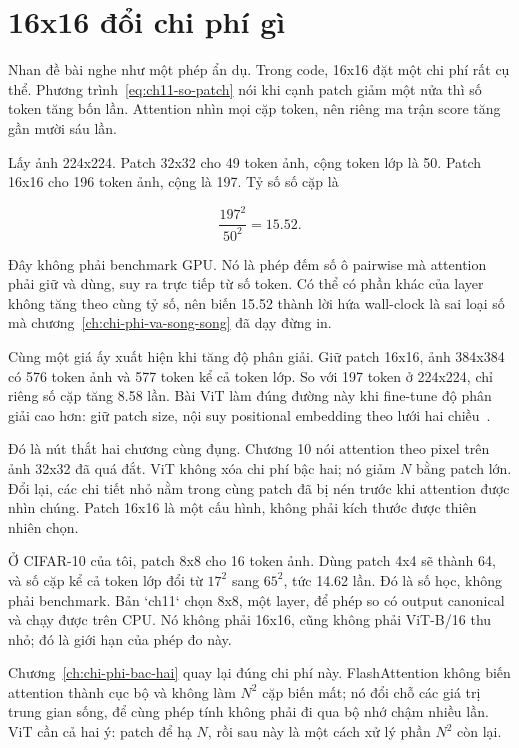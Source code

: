 \section{16x16 đổi chi phí gì}
\label{sec:ch11-chi-phi-patch}

%
Nhan đề bài nghe như một phép ẩn dụ. Trong code, 16x16 đặt một chi phí rất cụ
thể. Phương trình~\ref{eq:ch11-so-patch} nói khi cạnh patch giảm một nửa thì
số token tăng bốn lần. Attention nhìn mọi cặp token, nên riêng ma trận score
tăng gần mười sáu lần.

Lấy ảnh 224x224. Patch 32x32 cho 49 token ảnh, cộng token lớp là 50. Patch
16x16 cho 196 token ảnh, cộng  là 197. Tỷ số số cặp là

\begin{equation}
\label{eq:ch11-chi-phi-patch}
\frac{197^2}{50^2} = 15.52.
\end{equation}

Đây không phải benchmark GPU. Nó là phép đếm số ô pairwise mà attention phải
giữ và dùng, suy ra trực tiếp từ số token. Có thể có phần khác của layer không
tăng theo cùng tỷ số, nên biến 15.52 thành lời hứa wall-clock là sai loại số
mà chương~\ref{ch:chi-phi-va-song-song} đã dạy đừng in.

Cùng một giá ấy xuất hiện khi tăng độ phân giải. Giữ patch 16x16, ảnh 384x384
có 576 token ảnh và 577 token kể cả token lớp. So với 197 token ở 224x224,
chỉ riêng số cặp tăng 8.58 lần. Bài ViT làm đúng đường này khi fine-tune độ
phân giải cao hơn: giữ patch size, nội suy positional embedding theo lưới
hai chiều~\autocite{dosovitskiy2021vit}.

Đó là nút thắt hai chương cùng đụng. Chương 10 nói attention theo pixel trên
ảnh 32x32 đã quá đắt. ViT không xóa chi phí bậc hai; nó giảm \(N\) bằng patch
lớn. Đổi lại, các chi tiết nhỏ nằm trong cùng patch đã bị nén trước khi
attention được nhìn chúng. Patch 16x16 là một cấu hình, không phải kích thước
được thiên nhiên chọn.

Ở CIFAR-10 của tôi, patch 8x8 cho 16 token ảnh. Dùng patch 4x4 sẽ thành 64,
và số cặp kể cả token lớp đổi từ \(17^2\) sang \(65^2\), tức 14.62 lần. Đó là
số học, không phải benchmark. Bản `ch11` chọn 8x8, một layer, để phép so có
output canonical và chạy được trên CPU. Nó không phải 16x16, cũng không phải
ViT-B/16 thu nhỏ; đó là giới hạn của phép đo này.

Chương~\ref{ch:chi-phi-bac-hai} quay lại đúng chi phí này. FlashAttention
không biến attention thành cục bộ và không làm \(N^2\) cặp biến mất; nó đổi
chỗ các giá trị trung gian sống, để cùng phép tính không phải đi qua bộ nhớ
chậm nhiều lần. ViT cần cả hai ý: patch để hạ \(N\), rồi sau này là một cách
xử lý phần \(N^2\) còn lại.
